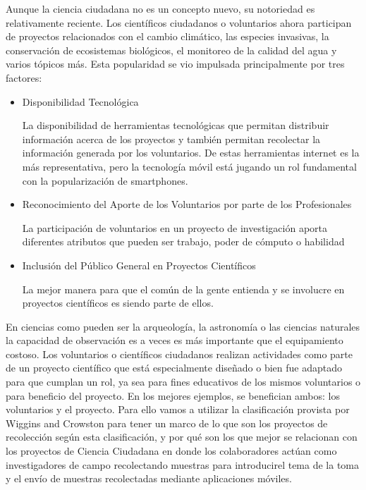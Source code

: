 	Aunque la ciencia ciudadana no es un concepto nuevo, su notoriedad es relativamente reciente. Los científicos ciudadanos o voluntarios ahora participan de proyectos relacionados con el cambio climático, las especies invasivas, la conservación de ecosistemas biológicos, el monitoreo de la calidad del agua y varios tópicos más. Esta popularidad se vio impulsada principalmente por tres factores:

\begin{itemize}
	\item {Disponibilidad Tecnológica}
	
	La disponibilidad de herramientas tecnológicas que permitan distribuir información acerca de los proyectos y también permitan recolectar la información generada por los voluntarios. De estas herramientas internet es la más representativa, pero la tecnología móvil está jugando un rol fundamental con la popularización de smartphones. \cite{silvertown2009new}
	\item {Reconocimiento del Aporte de los Voluntarios por parte de los Profesionales}
	
	La participación de voluntarios en un proyecto de investigación aporta diferentes atributos que pueden ser trabajo, poder de cómputo o habilidad \cite{cohn2008citizen}
	\item {Inclusión del Público General en Proyectos Científicos}
	
	La mejor manera para que el común de la gente entienda y se involucre en proyectos científicos es siendo parte de ellos. \cite{silvertown2009new}
\end{itemize} 

	En ciencias como pueden ser la arqueología, la astronomía o las ciencias naturales la capacidad de observación es a veces es más importante que el equipamiento costoso. Los voluntarios o científicos ciudadanos realizan actividades como parte de un proyecto científico que está especialmente diseñado o bien fue adaptado para que cumplan un rol, ya sea para fines educativos de los mismos voluntarios o para beneficio del proyecto. En los mejores ejemplos, se benefician ambos: los voluntarios y el proyecto.\cite{silvertown2009new}
	Para ello vamos a utilizar la clasificación provista por Wiggins and Crowston para tener un marco de lo que son los proyectos de recolección según esta clasificación, y por qué son los que mejor se relacionan con los proyectos de Ciencia Ciudadana en donde los colaboradores actúan como investigadores de campo recolectando muestras para introducirel tema de la toma y el envío de muestras recolectadas mediante aplicaciones móviles.	

